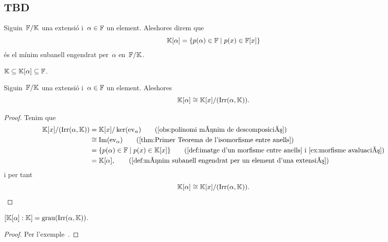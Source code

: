 \documentclass[../Apunts.tex]{subfiles}
\begin{document}
\subsection{TBD}
	\begin{definition}
		\label{def:mínim subanell engendrat per un element d'una extensió}
		Siguin~\(\mathbb{F}/\mathbb{K}\) una extensió i~\(\alpha\in\mathbb{F}\) un element. Aleshores direm que
		\[\mathbb{K}[\alpha]=\{p(\alpha)\in\mathbb{F}\mid p(x)\in\mathbb{F}[x]\}\]
		és el mínim subanell engendrat per~\(\alpha\) en~\(\mathbb{F}/\mathbb{K}\).
	\end{definition}
	\begin{observation}
	\label{obs:l'anell engendrat per alpha està entre l'extensió}
		\(\mathbb{K}\subseteq\mathbb{K}[\alpha]\subseteq\mathbb{F}\).
	\end{observation}
	\begin{proposition}
		\label{prop:el mínim subanell engendrat per un element és l'anell de polinomis quocient l'irreductible de l'element}
		Siguin~\(\mathbb{F}/\mathbb{K}\) una extensió i~\(\alpha\in\mathbb{F}\) un element. Aleshores
		\[\mathbb{K}[\alpha]\cong\mathbb{K}[x]/(\operatorname{Irr}(\alpha,\mathbb{K})).\]
		\begin{proof}
			Tenim que
			\begin{align*}
				\KK[x]/(\Irr(\alpha,\KK))&=\KK[x]/\ker(\ev_{\alpha}) \tag{\ref{obs:polinomi mínim de descomposició}}\\
				&\cong\Ima(\ev_{\alpha}) \tag{\ref{thm:Primer Teorema de l'isomorfisme entre anells}}\\
				&=\{p(\alpha)\in\FF\mid p(x)\in\KK[x]\} \tag{\ref{def:imatge d'un morfisme entre anells} i \ref{ex:morfisme avaluació}}\\
				&= \KK[\alpha], \tag{\ref{def:mínim subanell engendrat per un element d'una extensió}}
			\end{align*}
			i per tant
			\[\mathbb{K}[\alpha]\cong\mathbb{K}[x]/(\operatorname{Irr}(\alpha,\mathbb{K})).\qedhere\]
		\end{proof}
	\end{proposition}
	\begin{corollary}
		\label{cor:grau d'un mínim subanell engendrat per un element d'una extensió}
		\([\mathbb{K}[\alpha]:\mathbb{K}]=\operatorname{grau}(\operatorname{Irr}(\alpha,\mathbb{K}))\).
		\begin{proof}
			Per l'exemple~.
		\end{proof}
	\end{corollary}
\end{document}
